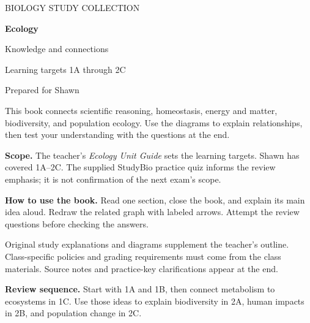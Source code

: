 \documentclass[11pt,letterpaper]{article}
\begin{document}
\hypersetup{pageanchor=false}
\begin{titlepage}
\vspace*{0.7in}
{\sffamily\large BIOLOGY STUDY COLLECTION\par}
\vspace{0.35in}
{\Huge\bfseries Ecology\par}
\vspace{0.15in}
{\LARGE Knowledge and connections\par}
\vspace{0.25in}
{\Large Learning targets 1A through 2C\par}
\vspace{0.3in}
{\large Prepared for Shawn\par}
\vspace{0.5in}
\par
\vspace{0.45in}
This book connects scientific reasoning, homeostasis, energy and matter, biodiversity, and population ecology. Use the diagrams to explain relationships, then test your understanding with the questions at the end.

\textbf{Scope.} The teacher's \textit{Ecology Unit Guide} sets the learning targets. Shawn has covered 1A--2C. The supplied StudyBio practice quiz informs the review emphasis; it is not confirmation of the next exam's scope.

\textbf{How to use the book.} Read one section, close the book, and explain its main idea aloud. Redraw the related graph with labeled arrows. Attempt the review questions before checking the answers.
\vfill
{\small Original study explanations and diagrams supplement the teacher's outline. Class-specific policies and grading requirements must come from the class materials. Source notes and practice-key clarifications appear at the end.\par}
\end{titlepage}
\hypersetup{pageanchor=true}
{\setlength{\parskip}{0pt}\small\tableofcontents}
\vspace{12pt}
\textbf{Review sequence.} Start with 1A and 1B, then connect metabolism to ecosystems in 1C. Use those ideas to explain biodiversity in 2A, human impacts in 2B, and population change in 2C.
\end{document}
